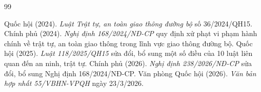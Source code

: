 \clearpage
{}
{}
{\small
\begin{thebibliography}{99}
\setlength{\itemsep}{0.15em}

 Quốc hội (2024). \emph{Luật Trật tự, an toàn giao thông đường bộ} số 36/2024/QH15.
 Chính phủ (2024). \emph{Nghị định 168/2024/NĐ-CP} quy định xử phạt vi phạm hành chính về trật tự, an toàn giao thông trong lĩnh vực giao thông đường bộ.
 Quốc hội (2025). \emph{Luật 118/2025/QH15} sửa đổi, bổ sung một số điều của 10 luật liên quan đến an ninh, trật tự.
 Chính phủ (2026). \emph{Nghị định 238/2026/NĐ-CP} sửa đổi, bổ sung Nghị định 168/2024/NĐ-CP.
 Văn phòng Quốc hội (2026). \emph{Văn bản hợp nhất 55/VBHN-VPQH} ngày 23/3/2026.


\end{thebibliography}}
